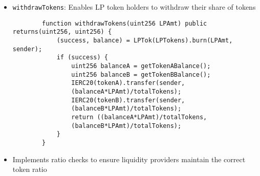 \documentclass[12pt,a4paper]{article}
\begin{document}
\begin{itemize}
        \item \texttt{withdrawTokens}: Enables LP token holders to withdraw their share of tokens
        \begin{listing}[H]
        \begin{verbatim}
        function withdrawTokens(uint256 LPAmt) public returns(uint256, uint256) {
            (success, balance) = LPTok(LPTokens).burn(LPAmt, sender);
            if (success) {
                uint256 balanceA = getTokenABalance();
                uint256 balanceB = getTokenBBalance();
                IERC20(tokenA).transfer(sender, 
                (balanceA*LPAmt)/totalTokens);
                IERC20(tokenB).transfer(sender, 
                (balanceB*LPAmt)/totalTokens);
                return ((balanceA*LPAmt)/totalTokens, 
                (balanceB*LPAmt)/totalTokens);
            }
        }
        \end{verbatim}
        \end{listing}
    \item Implements ratio checks to ensure liquidity providers maintain the correct token ratio
\end{itemize}
\end{document}
